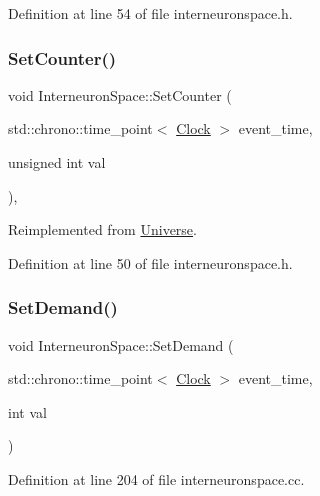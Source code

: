 Definition at line 54 of file interneuronspace.\+h.

\mbox{\label{class_interneuron_space_a60a46f22a2e575d65031635a698a60a9}} 
\subsubsection{\texorpdfstring{Set\+Counter()}{SetCounter()}}
{\footnotesize\ttfamily void Interneuron\+Space\+::\+Set\+Counter (\begin{DoxyParamCaption}\item[{std\+::chrono\+::time\+\_\+point$<$ \hyperlink{universe_8h_a0ef8d951d1ca5ab3cfaf7ab4c7a6fd80}{Clock} $>$}]{event\+\_\+time,  }\item[{unsigned int}]{val }\end{DoxyParamCaption})\hspace{0.3cm}{\ttfamily [inline]}, {\ttfamily [virtual]}}



Reimplemented from \hyperlink{class_universe_aa22202ae740eb1355529afcb13285e91}{Universe}.



Definition at line 50 of file interneuronspace.\+h.

\mbox{\label{class_interneuron_space_ad2225077a049e78ce583a79eee2d373f}} 
\subsubsection{\texorpdfstring{Set\+Demand()}{SetDemand()}}
{\footnotesize\ttfamily void Interneuron\+Space\+::\+Set\+Demand (\begin{DoxyParamCaption}\item[{std\+::chrono\+::time\+\_\+point$<$ \hyperlink{universe_8h_a0ef8d951d1ca5ab3cfaf7ab4c7a6fd80}{Clock} $>$}]{event\+\_\+time,  }\item[{int}]{val }\end{DoxyParamCaption})}



Definition at line 204 of file interneuronspace.\+cc.

